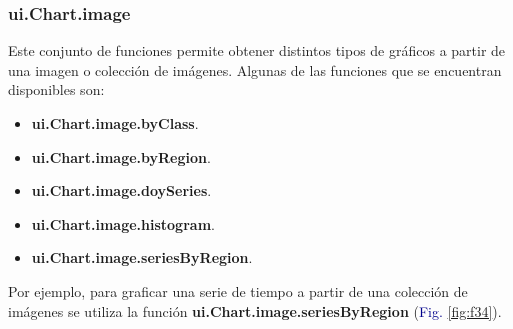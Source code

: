 \documentclass[
  12pt,
  letterpaper,
  twoside]{book}
\providecommand{\tightlist}{%
  \setlength{\itemsep}{0pt}\setlength{\parskip}{0pt}}
\newcommand\boldpurple[1]{\textcolor{darkpurple}{\textbf{#1}}}
\begin{document}
\hypertarget{ui.chart.image}{%
\subsubsection*{ui.Chart.image}\label{ui.chart.image}}

Este conjunto de funciones permite obtener distintos tipos de gráficos a partir de una imagen o colección de imágenes. Algunas de las funciones que se encuentran disponibles son:

\begin{itemize}
\tightlist
\item
  \boldpurple{ui.Chart.image.byClass}.
\item
  \boldpurple{ui.Chart.image.byRegion}.
\item
  \boldpurple{ui.Chart.image.doySeries}.
\item
  \boldpurple{ui.Chart.image.histogram}.
\item
  \boldpurple{ui.Chart.image.seriesByRegion}.
\end{itemize}

Por ejemplo, para graficar una serie de tiempo a partir de una colección de imágenes se utiliza la función \boldpurple{ui.Chart.image.seriesByRegion} (\textcolor{darkblue}{Fig.} \ref{fig:f34}).
\end{document}
